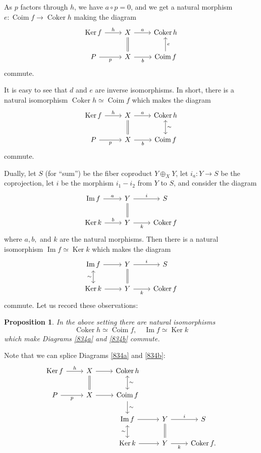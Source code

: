 \documentclass[12pt]{article}%
\newtheorem{prop}[thm]{Proposition}
\theoremstyle{remark}
\theoremstyle{definition}
\DeclareMathOperator{\Coim}{Coim}
\DeclareMathOperator{\Coker}{Coker}
\DeclareMathOperator{\Ima}{Im}
\DeclareMathOperator{\Ker}{Ker}
\begin{document}
As $p$ factors through $h$, we have $a\circ p=0$, and we get a natural morphism $e:\Coim f\to\Coker h$ making the diagram 
$$
\begin{tikzcd}
\Ker f\ar{r}{h}&X\ar[equal]{d}\ar{r}{a}&\Coker h\\ 
P\ar{r}[swap]{p}&X\ar{r}[swap]{b}&\Coim f\ar{u}[swap]{e}
\end{tikzcd}
$$ 
commute. 

It is easy to see that $d$ and $e$ are inverse isomorphisms. In short, there is a natural isomorphism $\Coker h\simeq\Coim f$ which makes the diagram
%
\begin{equation}\label{834a}
\begin{tikzcd}
\Ker f\ar{r}{h}&X\ar[equal]{d}\ar{r}{a}&\Coker h\ar[leftrightarrow]{d}{\sim}\\ 
P\ar{r}[swap]{p}&X\ar{r}[swap]{b}&\Coim f
\end{tikzcd}
\end{equation}
%
commute. 

Dually, let $S$ (for ``sum'') be the fiber coproduct $Y\oplus_XY$, let $i_a:Y\to S$ be the coprojection, let $i$ be the morphism $i_1-i_2$ from $Y$ to $S$, and consider the diagram 
%
$$
\begin{tikzcd}
\Ima f\ar{r}{a}&Y\ar[equal]{d}\ar{r}{i}&S\\ 
\Ker k\ar{r}{b}&Y\ar{r}[swap]{k}&\Coker f
\end{tikzcd}
$$ 
where $a,b,$ and $k$ are the natural morphisms. Then there is a natural isomorphism $\Ima f\simeq\Ker k$ which makes the diagram 
%
\begin{equation}\label{834b}
\begin{tikzcd}
\Ima f\ar[leftrightarrow]{d}[swap]{\sim}\ar{r}&Y\ar[equal]{d}\ar{r}{i}&S\\ 
\Ker k\ar{r}&Y\ar{r}[swap]{k}&\Coker f
\end{tikzcd}
\end{equation}
%
commute. Let us record these observations:
\begin{prop}\label{p834}
In the above setting there are natural isomorphisms 
$$
\Coker h\simeq\Coim f,\quad\Ima f\simeq\Ker k
$$ 
which make Diagrams \eqref{834a} and \eqref{834b} commute.
\end{prop}

Note that we can splice Diagrams \eqref{834a} and \eqref{834b}:
$$
\begin{tikzcd}
\Ker f\ar{r}{h} &X\ar[equal]{d}\ar{r}&\Coker h\ar[leftrightarrow]{d}{\sim}\\ 
P\ar{r}[swap]{p}&X\ar{r}             &\Coim f\ar{d}{\sim}\\ 
{}&{}&\Ima f\ar[leftrightarrow]{d}[swap]{\sim}\ar{r}&Y\ar[equal]{d}\ar{r}{i}&S\\ 
{}&{}&\Ker k\ar{r}&Y\ar{r}[swap]{k}&\Coker f.
\end{tikzcd}
$$ 
\end{document}
